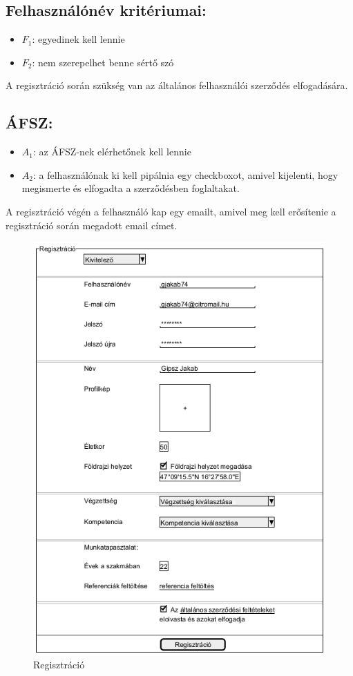 \subsection{Felhasználónév kritériumai:}

\begin{itemize}
    \item $F_1$: egyedinek kell lennie
    \item $F_2$: nem szerepelhet benne sértő szó
\end{itemize}

A regisztráció során szükség van az általános felhasználói szerződés elfogadására.

\subsection{ÁFSZ:}

\begin{itemize}
    \item $A_1$: az ÁFSZ-nek elérhetőnek kell lennie
    \item $A_2$: a felhasználónak ki kell pipálnia egy checkboxot, amivel kijelenti, hogy megismerte és elfogadta a szerződésben foglaltakat.
\end{itemize}

A regisztráció végén a felhasználó kap egy emailt, amivel meg kell erősítenie a regisztráció során megadott email címet.

\begin{figure}[h]
	\centering
	\includegraphics[scale=0.5]{img/regisztracio.png}
	\caption*{Regisztráció}
	\label{fig:reg}
\end{figure}